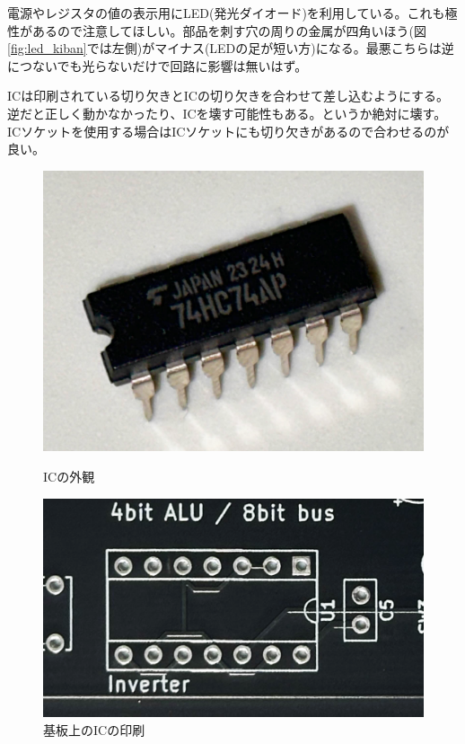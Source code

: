 \documentclass[xelatex,a5paper,ja=standard, openany]{bxjsbook}
\begin{document}
電源やレジスタの値の表示用にLED(発光ダイオード)を利用している。これも極性があるので注意してほしい。部品を刺す穴の周りの金属が四角いほう(図\ref{fig:led_kiban}では左側)がマイナス(LEDの足が短い方)になる。最悪こちらは逆につないでも光らないだけで回路に影響は無いはず。

ICは印刷されている切り欠きとICの切り欠きを合わせて差し込むようにする。逆だと正しく動かなかったり、ICを壊す可能性もある。というか絶対に壊す。ICソケットを使用する場合はICソケットにも切り欠きがあるので合わせるのが良い。

\begin{figure}[ht]
    \centering
    \begin{minipage}[t]{0.4\linewidth}
        \centering
        \includegraphics[keepaspectratio, width=\linewidth]{figure/ic.png}
        \caption{ICの外観}
        \label{fig:ic_overview}
    \end{minipage}
    \begin{minipage}[t]{0.45\linewidth}
        \centering
        \includegraphics[keepaspectratio, width=\linewidth]{figure/ic_chip.png}
        \caption{基板上のICの印刷}
        \label{fig:ic_print}
    \end{minipage}
\end{figure}
\end{document}
